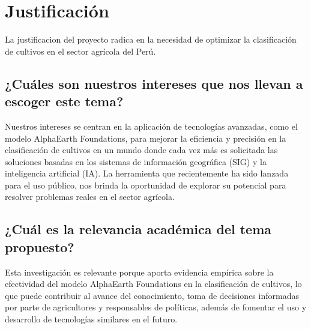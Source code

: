 \section{Justificación}

La justificacion del proyecto radica en la necesidad de optimizar la clasificación de cultivos en el sector agrícola del Perú.

\subsection{¿Cuáles son nuestros intereses que nos llevan a escoger este tema?}

Nuestros intereses se centran en la aplicación de tecnologías avanzadas, como el modelo AlphaEarth Foundations, para mejorar la eficiencia y precisión en la clasificación de cultivos en un mundo donde cada vez más es solicitada las soluciones basadas en los sistemas de información geográfica (SIG) y la inteligencia artificial (IA). La herramienta que recientemente ha sido lanzada para el uso público, nos brinda la oportunidad de explorar su potencial para resolver problemas reales en el sector agrícola.

\subsection{¿Cuál es la relevancia académica del tema propuesto?}

Esta investigación es relevante porque aporta evidencia empírica sobre la efectividad del modelo AlphaEarth Foundations en la clasificación de cultivos, lo que puede contribuir al avance del conocimiento, toma de decisiones informadas por parte de agricultores y responsables de políticas, además de fomentar el uso y desarrollo de tecnologías similares en el futuro.